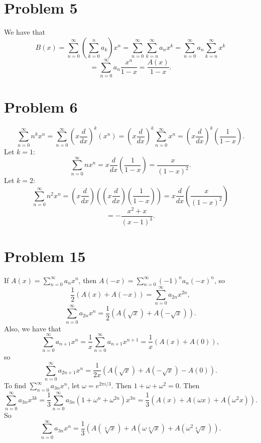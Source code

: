 \documentclass{article}
\newcommand{\bigp}[1]{\left(#1\right)}
\begin{document}
\section*{Problem 5}
We have that
$$B(x) = \sum_{n = 0}^\infty \bigp{\sum_{k = 0}^n a_k}x^n = \sum_{n = 0}^\infty \sum_{k = n}^\infty a_nx^k = \sum_{n = 0}^\infty a_n\sum_{k = n}^\infty x^k$$
$$= \sum_{n = 0}^\infty a_n \frac{x^n}{1 - x} = \frac{A(x)}{1 - x}.$$

\section*{Problem 6}
$$\sum_{n = 0}^\infty n^kx^n = \sum_{n = 0}^\infty \bigp{x\frac{d}{dx}}^k(x^n) = \bigp{x\frac{d}{dx}}^k\sum_{n = 0}^\infty x^n = \bigp{x\frac{d}{dx}}^k\bigp{\frac{1}{1 -x}}.$$
Let $k = 1$:
$$\sum_{n = 0}^\infty nx^n = x\frac{d}{dx}\bigp{\frac{1}{1 - x}} = \frac{x}{(1 - x)^2}.$$
Let $k = 2$:
$$\sum_{n = 0}^\infty n^2x^n = \bigp{x\frac{d}{dx}}\bigp{\bigp{x\frac{d}{dx}}\bigp{\frac{1}{1-x}}} = x\frac{d}{dx}\bigp{\frac{x}{(1 - x)^2}}$$
$$= -\frac{x^2 + x}{(x - 1)^3}.$$

\section*{Problem 15}
If $A(x) = \sum_{n = 0}^\infty a_nx^n$, then $A(-x) = \sum_{n = 0}^\infty (-1)^na_n(-x)^n$, so
$$\frac{1}{2}(A(x) + A(-x)) = \sum_{n = 0}^\infty a_{2n}x^{2n},$$
$$\sum_{n = 0}^\infty a_{2n}x^n = \frac{1}{2}(A(\sqrt{x}) + A(-\sqrt{x})).$$
Also, we have that
$$\sum_{n = 0}^\infty a_{n + 1}x^n = \frac{1}{x}\sum_{n = 0}^\infty a_{n + 1}x^{n + 1} = \frac{1}{x}(A(x) + A(0)),$$
so
$$\sum_{n = 0}^\infty a_{2n + 1}x^n = \frac{1}{2x}(A(\sqrt{x}) + A(-\sqrt{x}) - A(0)).$$
To find $\sum_{n = 0}^\infty a_{3n}x^n$, let $\omega = e^{2\pi i/3}$. Then $1 + \omega + \omega^2 = 0$. Then
$$\sum_{n = 0}^\infty a_{3n}x^{3k} = \frac{1}{3}\sum_{n = 0}^\infty a_{3n}(1 + \omega^n + \omega^{2n})x^{3n} = \frac{1}{3}(A(x) + A(\omega x) + A(\omega^2x)).$$
So
$$\sum_{n = 0}^\infty a_{3n}x^n = \frac{1}{3}(A(\sqrt[3]x) + A(\omega \sqrt[3]x) + A(\omega^2\sqrt[3]x)).$$
\end{document}
